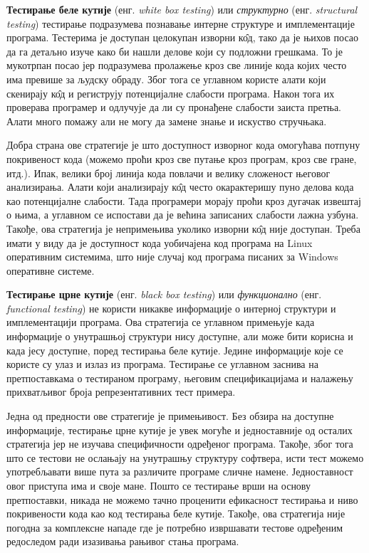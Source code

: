\documentclass[12pt,oneside]{memoir}
\begin{document}
\begin{description}
\item \textbf{Тестирање беле кутије} (енг. \textit{white box testing}) или \textit{структурно} (енг. \textit{structural testing}) тестирање подразумева познавање интерне структуре и имплементације програма. Тестерима је доступан целокупан изворни к\^{о}д, тако да је њихов посао да га детаљно изуче како би нашли делове који су подложни грешкама. То је мукотрпан посао јер подразумева пролажење кроз све линије кода којих често има превише за људску обраду. Због тога се углавном користе алати који скенирају к\^{о}д и региструју потенцијалне слабости програма. Након тога их проверава програмер и одлучује да ли су пронађене слабости заиста претња. Алати много помажу али не могу да замене знање и искуство стручњака. 
\par Добра страна ове стратегије је што доступност изворног кода омогућава потпуну покривеност кода (можемо проћи кроз све путање кроз програм, кроз све гране, итд.). Ипак, велики број линија кода повлачи и велику сложеност његовог анализирања. Алати који анализирају к\^{о}д често окарактеришу пуно делова кода као потенцијалне слабости. Тада програмери морају проћи кроз дугачак извештај о њима, а углавном се испостави да је већина записаних слабости лажна узбуна. Такође, ова стратегија је непримењива уколико изворни к\^{о}д није доступан. Треба имати у виду да је доступност кода уобичајена код програма на Linux оперативним системима, што није случај код програма писаних за Windows оперативне системе. 

\item \textbf{Тестирање црне кутије} (енг. \textit{black box testing}) или \textit{функционално} (енг. \textit{functional testing}) не користи никакве информације о интерној структури и имплементацији програма. Ова стратегија се углавном примењује када информације о унутрашњој структури нису доступне, али може бити корисна и када јесу доступне, поред тестирања беле кутије. Једине информације које се користе су улаз и излаз из програма. Тестирање се углавном заснива на претпоставкама о тестираном програму, његовим спецификацијама и налажењу прихватљивог броја репрезентативних тест примера.
\par Једна од предности ове стратегије је примењивост. Без обзира на доступне информације, тестирање црне кутије је увек могуће и једноставније од осталих стратегија јер не изучава специфичности одређеног програма. Такође, због тога што се тестови не ослањају на унутрашњу структуру софтвера, исти тест можемо употребљавати више пута за различите програме сличне намене. Једноставност овог приступа има и своје мане. Пошто се тестирање врши на основу претпоставки, никада не можемо тачно проценити ефикасност тестирања и ниво покривености кода као код тестирања беле кутије. Такође, ова стратегија није погодна за комплексне нападе где је потребно извршавати тестове одређеним редоследом ради изазивања рањивог стања програма.


\end{description}
\end{document}

